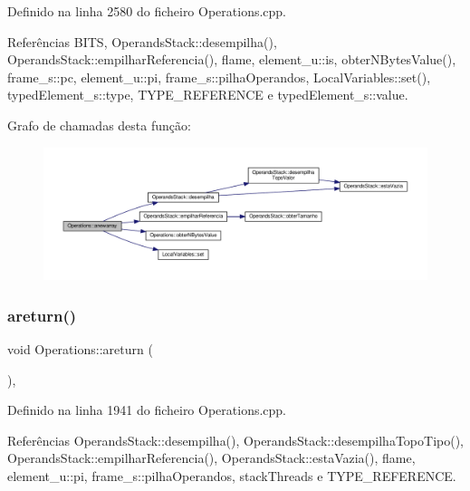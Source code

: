 Definido na linha 2580 do ficheiro Operations.\+cpp.



Referências B\+I\+TS, Operands\+Stack\+::desempilha(), Operands\+Stack\+::empilhar\+Referencia(), flame, element\+\_\+u\+::is, obter\+N\+Bytes\+Value(), frame\+\_\+s\+::pc, element\+\_\+u\+::pi, frame\+\_\+s\+::pilha\+Operandos, Local\+Variables\+::set(), typed\+Element\+\_\+s\+::type, T\+Y\+P\+E\+\_\+\+R\+E\+F\+E\+R\+E\+N\+CE e typed\+Element\+\_\+s\+::value.

Grafo de chamadas desta função\+:
\nopagebreak
\begin{figure}[H]
\begin{center}
\leavevmode
\includegraphics[width=350pt]{classOperations_aa5110e66aa565e9130be292935ef5c71_cgraph}
\end{center}
\end{figure}
\mbox{\label{classOperations_a5829421b72f92d50dea0461953b26c5b}} 
\subsubsection{\texorpdfstring{areturn()}{areturn()}}
{\footnotesize\ttfamily void Operations\+::areturn (\begin{DoxyParamCaption}{ }\end{DoxyParamCaption})\hspace{0.3cm}{\ttfamily [static]}, {\ttfamily [private]}}



Definido na linha 1941 do ficheiro Operations.\+cpp.



Referências Operands\+Stack\+::desempilha(), Operands\+Stack\+::desempilha\+Topo\+Tipo(), Operands\+Stack\+::empilhar\+Referencia(), Operands\+Stack\+::esta\+Vazia(), flame, element\+\_\+u\+::pi, frame\+\_\+s\+::pilha\+Operandos, stack\+Threads e T\+Y\+P\+E\+\_\+\+R\+E\+F\+E\+R\+E\+N\+CE.

